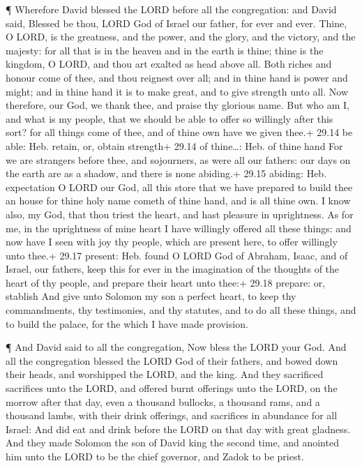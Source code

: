  ¶ Wherefore David blessed the LORD before all the
congregation: and David said, Blessed be thou, LORD God of Israel our
father, for ever and ever.  Thine, O LORD, is the
greatness, and the power, and the glory, and the victory, and the
majesty: for all that is in the heaven and in the earth is thine; thine
is the kingdom, O LORD, and thou art exalted as head above all.
 Both riches and honour come of thee, and thou reignest
over all; and in thine hand is power and might; and in thine hand it is
to make great, and to give strength unto all.  Now
therefore, our God, we thank thee, and praise thy glorious name.
 But who am I, and what is my people, that we should be
able to offer so willingly after this sort? for all things come of thee,
and of thine own have we given thee.+ 29.14 be able: Heb. retain, or,
obtain strength+ 29.14 of thine\ldots: Heb. of thine hand 
For we are strangers before thee, and sojourners, as were all our
fathers: our days on the earth are as a shadow, and there is none
abiding.+ 29.15 abiding: Heb. expectation  O LORD our God,
all this store that we have prepared to build thee an house for thine
holy name cometh of thine hand, and is all thine own.  I
know also, my God, that thou triest the heart, and hast pleasure in
uprightness. As for me, in the uprightness of mine heart I have
willingly offered all these things: and now have I seen with joy thy
people, which are present here, to offer willingly unto thee.+ 29.17
present: Heb. found  O LORD God of Abraham, Isaac, and of
Israel, our fathers, keep this for ever in the imagination of the
thoughts of the heart of thy people, and prepare their heart unto thee:+
29.18 prepare: or, stablish  And give unto Solomon my son a
perfect heart, to keep thy commandments, thy testimonies, and thy
statutes, and to do all these things, and to build the palace, for the
which I have made provision.

 ¶ And David said to all the congregation, Now bless the
LORD your God. And all the congregation blessed the LORD God of their
fathers, and bowed down their heads, and worshipped the LORD, and the
king.  And they sacrificed sacrifices unto the LORD, and
offered burnt offerings unto the LORD, on the morrow after that day,
even a thousand bullocks, a thousand rams, and a thousand lambs, with
their drink offerings, and sacrifices in abundance for all Israel:
 And did eat and drink before the LORD on that day with
great gladness. And they made Solomon the son of David king the second
time, and anointed him unto the LORD to be the chief governor, and Zadok
to be priest.

